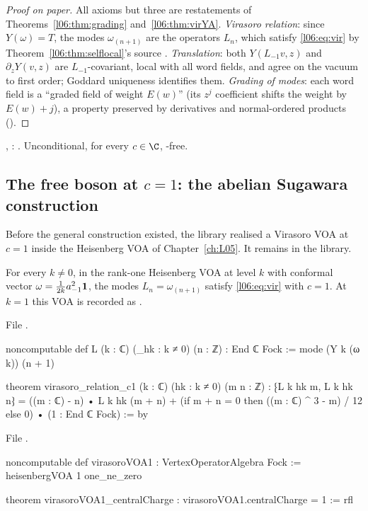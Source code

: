 \begin{proof}[Proof on paper]
All axioms but three are restatements of Theorems~\ref{l06:thm:grading} and~\ref{l06:thm:virYA}.
\emph{Virasoro relation}: since $Y(\omega) = T$, the modes $\omega_{(n+1)}$ are the operators $L_n$, which
satisfy \eqref{l06:eq:vir} by Theorem~\ref{l06:thm:selflocal}'s source .
\emph{Translation}: both $Y(L_{-1}v,z)$ and $\partial_zY(v,z)$ are $L_{-1}$-covariant, local with all word
fields, and agree on the vacuum to first order; Goddard uniqueness identifies them.
\emph{Grading of modes}: each word field is a ``graded field of weight $E(w)$'' (its $z^j$ coefficient
shifts the weight by $E(w)+j$), a property preserved by derivatives and normal-ordered products
().
\end{proof}

\begin{status}
\allowbreak{}\allowbreak{}, \allowbreak{}\allowbreak{}\allowbreak{}\allowbreak{}:
\lean{[propext, Classical.}\allowbreak{}\allowbreak\lean{sound]}. Unconditional, for every $c\in\C$, -free.
\end{status}

\subsection{The free boson at \texorpdfstring{$c = 1$}{c = 1}: the abelian Sugawara construction}\label{l06:sec:sugawara}

Before the general construction existed, the library realised a Virasoro VOA at $c = 1$ inside the
Heisenberg VOA of Chapter~\ref{ch:L05}. It remains in the library.

\begin{theorem}[Sugawara at $c = 1$]\label{l06:thm:sugawara}
For every $k\ne0$, in the rank-one Heisenberg VOA at level $k$ with conformal vector
$\omega = \frac1{2k}a_{-1}^2\mathbf{1}$, the modes $L_n = \omega_{(n+1)}$ satisfy \eqref{l06:eq:vir} with
$c = 1$. At $k = 1$ this VOA is recorded as .
\end{theorem}

File .
\begin{leancode}
noncomputable def L (k : ℂ) (_hk : k ≠ 0) (n : ℤ) : End ℂ Fock :=
  mode (Y k (ω k)) (n + 1)

theorem virasoro_relation_c1 (k : ℂ) (hk : k ≠ 0) (m n : ℤ) :
    ⁅L k hk m, L k hk n⁆
      = ((m : ℂ) - n) • L k hk (m + n)
        + (if m + n = 0 then ((m : ℂ) ^ 3 - m) / 12 else 0) • (1 : End ℂ Fock) := by
\end{leancode}
File .
\begin{leancode}
noncomputable def virasoroVOA1 : VertexOperatorAlgebra Fock :=
  heisenbergVOA 1 one_ne_zero

theorem virasoroVOA1_centralCharge : virasoroVOA1.centralCharge = 1 := rfl
\end{leancode}

